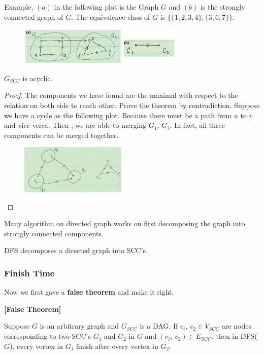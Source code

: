 Example, $(a)$ in the following plot is the Graph $G$ and $(b)$ is the strongly 
connected graph of $G$. The equivalence class of $G$ is $\{\{1, 2, 3, 4\}, 
\{3, 6, 7\}\}$.

\begin{figure}[H]
\centering
\includegraphics[width=0.7\textwidth]{scg.png}
\end{figure}

\begin{theorem}
 $G_{SCC}$ is acyclic.
\end{theorem}

\begin{proof}
 The components we have found are the maximal with respect to the relation on 
both side to reach other. Prove the theorem by contradiction. Suppose we have a 
cycle as the following plot. Because there must be a path from $u$ to $v$ and 
vice versa. Then , we are able to merging $G_1$, $G_3$. In fact, all three 
components can be merged together.

\begin{figure}[H]
\centering
\includegraphics[width=0.45\textwidth]{scg-contradiction.png}
\end{figure}
\end{proof}

Many algorithm on directed graph works on first decomposing the graph into 
strongly connected components.

DFS decomposes a directed graph into SCC's.

\subsubsection{Finish Time}
Now we first gave a \textbf{false theorem} and make it right.
\begin{theorem}\textbf{[False Theorem]}

Suppose $G$ is an arbitrary graph and $G_{SCC}$ is a DAG. If $c_i, ~c_2 \in V_{SCC}$ are nodes corresponding to two SCC's $G_1$ and $G_2$ in $G$ and $(c_i, ~c_2) \in E_{SCC}$, then in DFS($G$), every vertex in $G_1$ finish after every vertex in $G_2$. 
\end{theorem}

